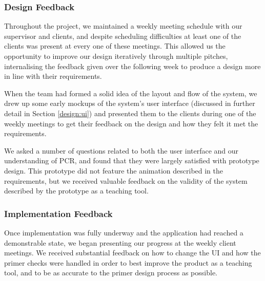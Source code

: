 \subsubsection{Design Feedback}
Throughout the project, we maintained a weekly meeting schedule with our
supervisor and clients, and despite scheduling difficulties at least one
of the clients was present at every one of these meetings. This allowed
us the opportunity to improve our design iteratively through multiple
pitches, internalising the feedback given over the following week to 
produce a design more in line with their requirements.

When the team had formed a solid idea of the layout and flow of the
system, we drew up some early mockups of the system's user interface
(discussed in further detail in Section \ref{design:ui}) and presented
them to the clients during 
one of the weekly meetings %
to get their feedback on the design and how they felt it met the 
requirements. 

We asked a number of questions related to both the user
interface and our understanding of PCR, and found that they were largely
satisfied with prototype design. This prototype did not feature the
animation described in the requirements, but we received valuable feedback
on the validity of the system described by the prototype as a teaching
tool.


\subsubsection{Implementation Feedback}
Once implementation was fully underway and the application had reached
a demonstrable state, we began presenting our progress at the weekly client
meetings. We received substantial feedback on how to change the UI and 
how the primer checks were handled in order
to best improve the product as a teaching tool, and to be as accurate to
the primer design process as possible.  
